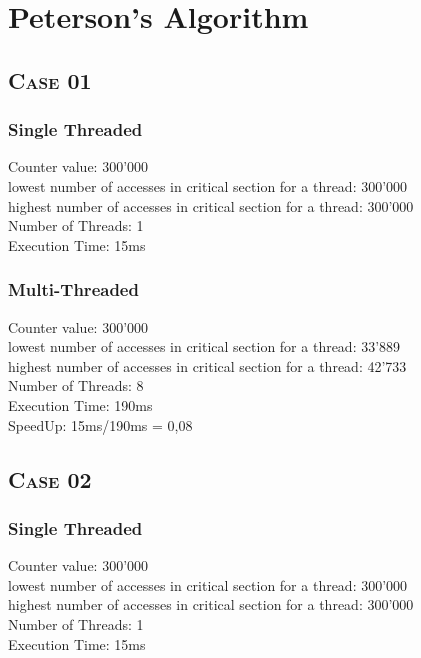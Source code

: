 \documentclass{article}
\begin{document}
	\pagestyle{fancy}
	\hfill
	\section{Peterson's Algorithm}
	\begin{adjustwidth}{2em}{2em}
		\subsection*{\textsc{Case} 01}
		\begin{adjustwidth}{2em}{2em}
			\subsubsection*{Single Threaded}
			\begin{adjustwidth}{2em}{2em}
				Counter value: 300'000 \\
				lowest number of accesses in critical section for a thread: 300'000 \\
				highest number of accesses in critical section for a thread: 300'000 \\
				Number of Threads: 1 \\
				Execution Time: 15ms
			\end{adjustwidth}
			\subsubsection*{Multi-Threaded}
			\begin{adjustwidth}{2em}{2em}
				Counter value: 300'000 \\
				lowest number of accesses in critical section for a thread: 33'889 \\
				highest number of accesses in critical section for a thread: 42'733 \\
				Number of Threads: 8 \\
				Execution Time: 190ms \\
				SpeedUp: 15ms/190ms = 0,08
			\end{adjustwidth}
		\end{adjustwidth}
		\subsection*{\textsc{Case} 02}
		\begin{adjustwidth}{2em}{2em}
			\subsubsection*{Single Threaded}
			\begin{adjustwidth}{2em}{2em}
				Counter value: 300'000 \\
				lowest number of accesses in critical section for a thread: 300'000 \\
				highest number of accesses in critical section for a thread: 300'000 \\
				Number of Threads: 1 \\
				Execution Time: 15ms
			\end{adjustwidth}

\end{adjustwidth}
\end{adjustwidth}
\end{document}
